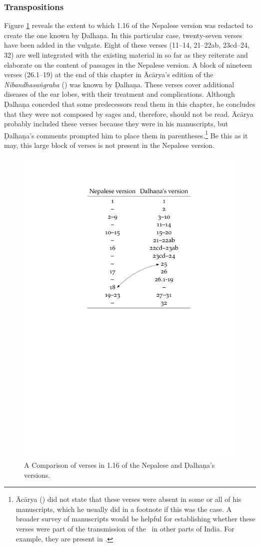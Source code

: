 \subsubsection{Transpositions}


Figure \ref{fig:chapters} reveals the extent to which 1.16 of the Nepalese version
was redacted to create the one known by Ḍalhaṇa. In this particular case,
twenty-seven verses have been added in the vulgate.  Eight of these verses
(11--14, 21--22ab, 23cd--24, 32) are well integrated with the existing material in
so far as they reiterate and elaborate on the content of passages in the Nepalese
version. A block of nineteen verses (26.1--19) at the end of this chapter in
Ācārya's edition of the \emph{Nibandhasaṅgraha} (\cite[80]{vulgate}) was known by
Ḍalhaṇa. These verses cover additional diseases of the ear lobes, with their
treatment and complications. Although Ḍalhaṇa conceded that some predecessors read
them in this chapter, he concludes that they were not composed by sages and,
therefore, should not be read. Ācārya probably included these verses because they
were in his manuscripts, but Ḍalhaṇa's comments prompted him to place them in
parentheses.\footnote{Ācārya (\cite[80]{vulgate}) did not state that these verses
    were absent in some or all of his manuscripts, which he usually did in a footnote
    if this was the case. A broader survey of manuscripts would be helpful for
    establishing whether these verses were part of the transmission of the \SS\ in
    other parts of India. For example, they are present in .}  Be this as it may, this large block of verses is not present in the
    Nepalese version.
\begin{figure}[t]
\centering
\includegraphics[draft=false,width=.75\textwidth]{media/table-of-versions.pdf}
\caption{A Comparison of verses in 1.16 of the Nepalese and Ḍalhaṇa's versions.}
\label{fig:chapters}
\end{figure}

